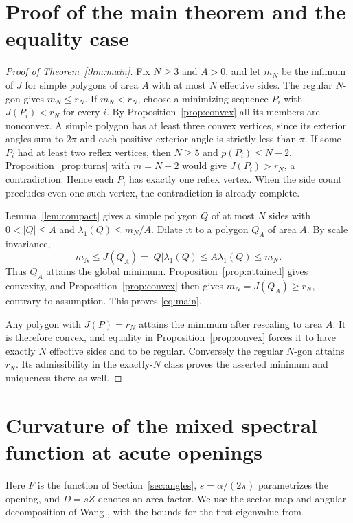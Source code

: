 \documentclass[11pt,a4paper,reqno]{amsart}
\theoremstyle{remark}
\numberwithin{equation}{section}
\begin{document}
\section{Proof of the main theorem and the equality case}\label{sec:assembly}
\begin{proof}[Proof of Theorem~\ref{thm:main}]
Fix $N\ge3$ and $A>0$, and let $m_N$ be the infimum of $J$ for simple
polygons of area $A$ with at most $N$ effective sides. The regular
$N$-gon gives $m_N\le r_N$. If $m_N<r_N$, choose a minimizing sequence
$P_i$ with $J(P_i)<r_N$ for every $i$. By Proposition~\ref{prop:convex}
all its members are nonconvex. A simple polygon has at least three convex
vertices, since its exterior angles sum to $2\pi$ and each positive exterior
angle is strictly less than $\pi$. If some $P_i$ had at least two reflex
vertices, then $N\ge5$ and $p(P_i)\le N-2$. Proposition~\ref{prop:turns}
with $m=N-2$ would give $J(P_i)>r_N$, a contradiction.
Hence each $P_i$ has exactly one reflex vertex. When the side count precludes
even one such vertex, the contradiction is already complete.

Lemma~\ref{lem:compact} gives a simple polygon $Q$ of at most $N$ sides
with $0<|Q|\le A$ and $\lambda_1(Q)\le m_N/A$. Dilate it to a polygon
$Q_A$ of area $A$. By scale invariance,
\[
 m_N\le J(Q_A)=|Q|\lambda_1(Q)\le A\lambda_1(Q)\le m_N .
\]
Thus $Q_A$ attains the global minimum. Proposition~\ref{prop:attained}
gives convexity, and Proposition~\ref{prop:convex} then gives
$m_N=J(Q_A)\ge r_N$, contrary to assumption. This proves \eqref{eq:main}.

Any polygon with $J(P)=r_N$ attains the minimum after rescaling to area
$A$. It is therefore convex, and equality in Proposition~\ref{prop:convex}
forces it to have exactly $N$ effective sides and to be regular.
Conversely the regular $N$-gon attains $r_N$. Its admissibility in the
exactly-$N$ class proves the asserted minimum and uniqueness there as well.
\end{proof}

\appendix
\section{Curvature of the mixed spectral function at acute openings}\label{app:acute}
Here $F$ is the function of Section~\ref{sec:angles}, $s=\alpha/(2\pi)$
parametrizes the opening, and $D=sZ$ denotes an area factor. We use the
sector map and angular decomposition of Wang \cite[Appendix~S1]{wang}, with
the bounds for the first eigenvalue from \cite{unified}.
\end{document}
